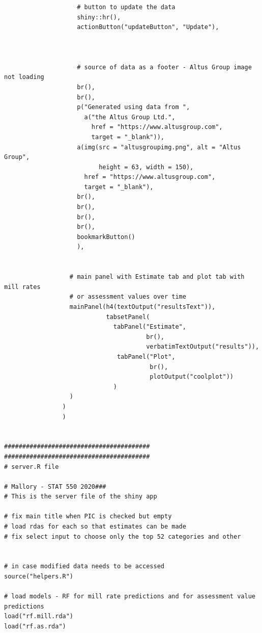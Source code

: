 \documentclass{article}
\begin{document}
\begin{lstlisting}[style=R, caption={Code used for the Shiny app.}, captionpos=b]
                    
                    
                    # button to update the data
                    shiny::hr(),
                    actionButton("updateButton", "Update"),
                    
                      
                    
                    # source of data as a footer - Altus Group image not loading
                    br(),
                    br(),
                    p("Generated using data from ",
                      a("the Altus Group Ltd.",
                        href = "https://www.altusgroup.com",
                        target = "_blank")),
                    a(img(src = "altusgroupimg.png", alt = "Altus Group",
                          height = 63, width = 150),
                      href = "https://www.altusgroup.com",
                      target = "_blank"),
                    br(),
                    br(),
                    br(),
                    br(),
                    bookmarkButton()
                    ),
                
                 
                  # main panel with Estimate tab and plot tab with mill rates
                  # or assessment values over time
                  mainPanel(h4(textOutput("resultsText")),
                            tabsetPanel(
                              tabPanel("Estimate", 
                                       br(),
                                       verbatimTextOutput("results")),
                               tabPanel("Plot", 
                                        br(),
                                        plotOutput("coolplot"))
                              )
                  )
                )
                )

                
########################################
########################################
# server.R file

# Mallory - STAT 550 2020###
# This is the server file of the shiny app

# fix main title when PIC is checked but empty 
# load rdas for each so that estimates can be made
# fix select input to choose only the top 52 categories and other


# in case modified data needs to be accessed
source("helpers.R")

# load models - RF for mill rate predictions and for assessment value predictions
load("rf.mill.rda")
load("rf.as.rda")



\end{lstlisting}
\end{document}
